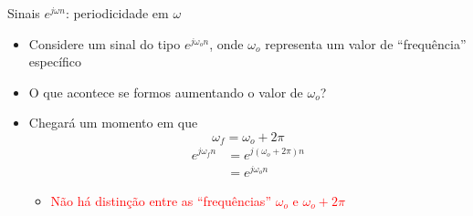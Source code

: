  \begin{slide}{Sinais $e^{j\omega n}$: periodicidade em $\omega$ }
    \begin{itemize}
     \item <1-4> Considere um sinal do tipo $e^{j\omega_o n}$, onde $\omega_o$ representa um valor de ``frequência'' específico
     \item <2-4> O que acontece se formos aumentando o valor de $\omega_o$?
     \item <3-4> Chegará um momento em que 
        \begin{equation*}
             \omega_f = \omega_o + 2\pi
        \end{equation*}
        \begin{equation*}
        \begin{split}
           e^{j\omega_f n} & = e^{j(\omega_o + 2\pi)n} \\
                           &=e^{j\omega_o n}
         \end{split}
        \end{equation*}
        \begin{itemize}
           \item <4>\textcolor{red}{Não há distinção entre as ``frequências'' $\omega_o$ e $\omega_o+2\pi$}
     \end{itemize}
   \end{itemize}
 \end{slide}
 
